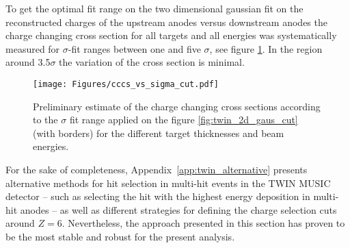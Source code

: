 
To get the optimal fit range on the two dimensional gaussian fit on the reconstructed charges of the upstream anodes versus downstream anodes the charge changing cross section for all targets and all energies was systematically measured for $\sigma$-fit ranges between one and five $\sigma$, see figure \ref{fig:cccs_vs_sigma_cut}. In the region around 3.5$\sigma$ the variation of the cross section is minimal.\newline
\begin{figure}[htpb]
    \centering
    \texttt{[image: Figures/cccs\_vs\_sigma\_cut.pdf]}
    \caption{
    Preliminary estimate of the charge changing cross sections according to the $\sigma$ fit range applied on the figure \ref{fig:twin_2d_gaus_cut} (with borders) for the different target thicknesses and beam energies.
     }
    \label{fig:cccs_vs_sigma_cut}
\end{figure}

For the sake of completeness, Appendix~\ref{app:twin_alternative} presents alternative methods for hit selection in multi-hit events in the TWIN MUSIC detector -- such as selecting the hit with the highest energy deposition in multi-hit anodes -- as well as different strategies for defining the charge selection cuts around $Z = 6$. Nevertheless, the approach presented in this section has proven to be the most stable and robust for the present analysis.

